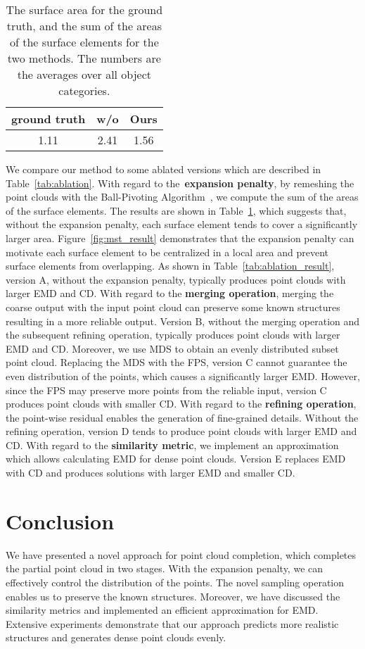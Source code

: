 \documentclass[letterpaper]{article} \usepackage{aaai20}  \usepackage{times}  \usepackage{helvet} \usepackage{courier}  \usepackage[hyphens]{url}  \usepackage{graphicx} \urlstyle{rm} \def\UrlFont{\rm}  \usepackage{graphicx}  \frenchspacing  \setlength{\pdfpagewidth}{8.5in}  \setlength{\pdfpageheight}{11in}  \usepackage{amsmath}
\begin{document}
\begin{table}[t]
  \centering
  \caption{The surface area for the ground truth, and the sum of the areas of the surface elements for the two methods. The numbers are the averages over all object categories.}
    \begin{tabular}{ccc}
    \hline
    ground truth & w/o  & Ours  \\
    \hline
    1.11   & 2.41 & 1.56  \\
    \hline
    \end{tabular}\label{tab:area}\end{table}

We compare our method to some ablated versions which are described in Table~\ref{tab:ablation}. With regard to the~\textbf{expansion penalty}, by remeshing the point clouds with the Ball-Pivoting Algorithm~\cite{817351}, we compute the sum of the areas of the surface elements. The results are shown in Table~\ref{tab:area}, which suggests that, without the expansion penalty, each surface element tends to cover a significantly larger area. Figure~\ref{fig:mst_result} demonstrates that the expansion penalty can motivate each surface element to be centralized in a local area and prevent surface elements from overlapping. As shown in Table~\ref{tab:ablation_result}, version A, without the expansion penalty, typically produces point clouds with larger EMD and CD. With regard to the \textbf{merging operation}, merging the coarse output with the input point cloud can preserve some known structures resulting in a more reliable output. Version B, without the merging operation and the subsequent refining operation, typically produces point clouds with larger EMD and CD. Moreover, we use MDS to obtain an evenly distributed subset point cloud. Replacing the MDS with the FPS, version C cannot guarantee the even distribution of the points, which causes a significantly larger EMD. However, since the FPS may preserve more points from the reliable input, version C produces point clouds with smaller CD. With regard to the \textbf{refining operation}, the point-wise residual enables the generation of fine-grained details. Without the refining operation, version D tends to produce point clouds with larger EMD and CD. With regard to the \textbf{similarity metric}, we implement an approximation which allows calculating EMD for dense point clouds. Version E replaces EMD with CD and produces solutions with larger EMD and smaller CD.
 
\section{Conclusion}
We have presented a novel approach for point cloud completion, which completes the partial point cloud in two stages. With the expansion penalty, we can effectively control the distribution of the points. The novel sampling operation enables us to preserve the known structures. Moreover, we have discussed the similarity metrics and implemented an efficient approximation for EMD. Extensive experiments demonstrate that our approach predicts more realistic structures and generates dense point clouds evenly.

{
\fontsize{8.1pt}{9.1pt} \selectfont

}
\end{document}
